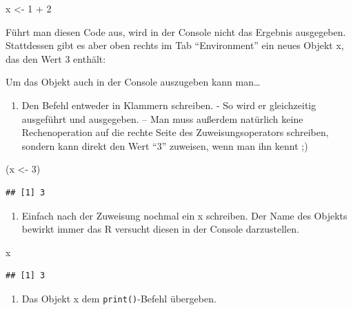 \documentclass[
]{book}
\newenvironment{Shaded}{\begin{snugshade}}{\end{snugshade}}
\newcommand{\DecValTok}[1]{\textcolor[rgb]{0.00,0.00,0.81}{#1}}
\newcommand{\NormalTok}[1]{#1}
\newcommand{\OtherTok}[1]{\textcolor[rgb]{0.56,0.35,0.01}{#1}}
\newcommand{\SpecialCharTok}[1]{\textcolor[rgb]{0.00,0.00,0.00}{#1}}
\providecommand{\tightlist}{%
  \setlength{\itemsep}{0pt}\setlength{\parskip}{0pt}}
\begin{document}
\begin{Shaded}
\begin{Highlighting}[]
\NormalTok{x }\OtherTok{\textless{}{-}} \DecValTok{1} \SpecialCharTok{+} \DecValTok{2}
\end{Highlighting}
\end{Shaded}

Führt man diesen Code aus, wird in der Console nicht das Ergebnis ausgegeben. Stattdessen gibt es aber oben rechts im Tab ``Environment'' ein neues Objekt x, das den Wert 3 enthält:

Um das Objekt auch in der Console auszugeben kann man\ldots{}

\begin{enumerate}
\def\labelenumi{\arabic{enumi}.}
\tightlist
\item
  Den Befehl entweder in Klammern schreiben. - So wird er gleichzeitig ausgeführt und ausgegeben. -- Man muss außerdem natürlich keine Rechenoperation auf die rechte Seite des Zuweisungsoperators schreiben, sondern kann direkt den Wert ``3'' zuweisen, wenn man ihn kennt ;)
\end{enumerate}

\begin{Shaded}
\begin{Highlighting}[]
\NormalTok{(x }\OtherTok{\textless{}{-}} \DecValTok{3}\NormalTok{)}
\end{Highlighting}
\end{Shaded}

\begin{verbatim}
## [1] 3
\end{verbatim}

\begin{enumerate}
\def\labelenumi{\arabic{enumi}.}
\setcounter{enumi}{1}
\tightlist
\item
  Einfach nach der Zuweisung nochmal ein x schreiben. Der Name des Objekts bewirkt immer das R versucht diesen in der Console darzustellen.
\end{enumerate}

\begin{Shaded}
\begin{Highlighting}[]
\NormalTok{x}
\end{Highlighting}
\end{Shaded}

\begin{verbatim}
## [1] 3
\end{verbatim}

\begin{enumerate}
\def\labelenumi{\arabic{enumi}.}
\setcounter{enumi}{2}
\tightlist
\item
  Das Objekt x dem \texttt{print()}-Befehl übergeben.
\end{enumerate}
\end{document}
